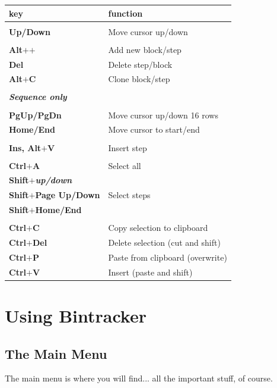 \documentclass[12pt]{report}	%
\begin{document}
\begin{longtable}{p{} p{} }
\textbf{key} & \textbf{function} \\
\hline
\\
\textbf{Up/Down} & Move cursor up/down\\
\\
\textbf{Alt\(\bm{+}\)\(\bm{+}\)} & Add new block/step \\
\textbf{Del} & Delete step/block \\
\textbf{Alt\(\bm{+}\)C} & Clone block/step \\
\\
\textit{\textbf{Sequence only}} & \\
\hline
\\
\textbf{PgUp/PgDn} & Move cursor up/down 16 rows \\
\textbf{Home/End} & Move cursor to start/end \\
\\
\textbf{Ins, Alt\(\bm{+}\)V} & Insert step \\
\\
\textbf{Ctrl\(\bm{+}\)A} & Select all \\
\textbf{Shift\(\bm{+}\)\textit{up/down}} &\\
\textbf{Shift\(\bm{+}\)Page Up/Down} & Select steps\\
\textbf{Shift\(\bm{+}\)Home/End} & \\
\\
\textbf{Ctrl\(\bm{+}\)C} & Copy selection to clipboard \\
\textbf{Ctrl\(\bm{+}\)Del} & Delete selection (cut and shift) \\
\textbf{Ctrl\(\bm{+}\)P} & Paste from clipboard (overwrite) \\
\textbf{Ctrl\(\bm{+}\)V} & Insert (paste and shift) \\
\end{longtable}


\chapter{Using Bintracker}
\section{The Main Menu}

The main menu is where you will find... all the important stuff, of course.
\end{document}
